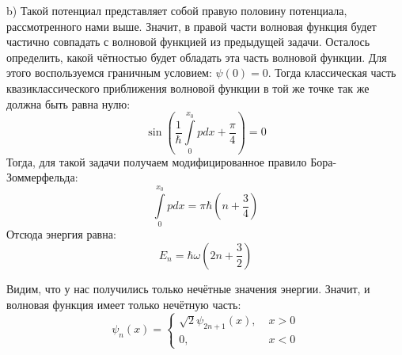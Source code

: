 b) Такой потенциал представляет собой правую половину потенциала, рассмотренного нами выше. Значит, в правой части волновая функция будет частично совпадать с волновой функцией из предыдущей задачи. Осталось определить, какой чётностью будет обладать эта часть волновой функции. Для этого воспользуемся граничным условием: $\psi(0) = 0$. Тогда классическая часть квазиклассического приближения волновой функции в той же точке так же должна быть равна нулю:
\[
\sin\left(\frac{1}{\hbar}\int\limits_0^{x_0} p dx + \frac{\pi}{4} \right) = 0
\]
Тогда, для такой задачи получаем модифицированное правило Бора-Зоммерфельда:
\[
\int\limits_0^{x_0} p dx = \pi\hbar\left(n +\frac{3}{4} \right)
\]
Отсюда энергия равна:
\[
E_n = \hbar\omega(2n + \frac{3}{2})
\]

Видим, что у нас получились только нечётные значения энергии. Значит, и волновая функция имеет только нечётную часть:
\[
\psi_n(x) =
\begin{cases}
    \sqrt{2}\psi_{2n+1}(x), \; &x > 0\\
    0, \; &x < 0
\end{cases}
\]
